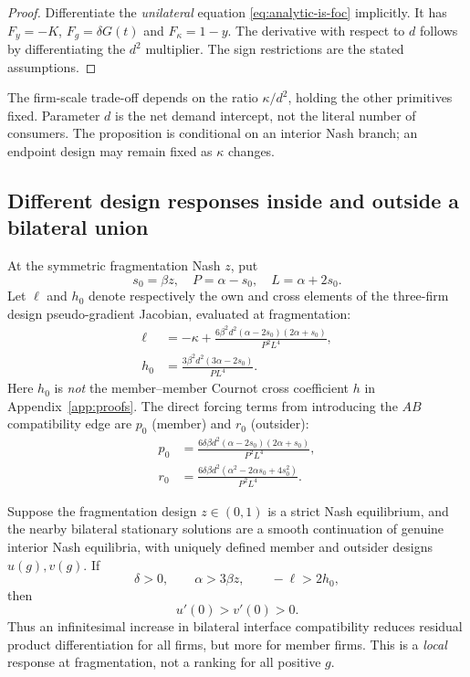 \begin{proof}
Differentiate the \emph{unilateral} equation
\eqref{eq:analytic-is-foc} implicitly.
It has $F_y=-K$, $F_g=\delta G(t)$ and
$F_\kappa=1-y$.
The derivative with respect to $d$ follows
by differentiating the $d^2$ multiplier.
The sign restrictions are the stated assumptions.
\end{proof}

The firm-scale trade-off depends on the ratio $\kappa/d^2$,
holding the other primitives fixed. Parameter $d$ is the
net demand intercept, not the literal number of consumers.
The proposition is conditional on an interior Nash branch;
an endpoint design may remain fixed as $\kappa$ changes.

\subsection{Different design responses inside and outside a bilateral union}

At the symmetric fragmentation Nash $z$, put
\[
 s_0=\beta z,\quad P=\alpha-s_0,\quad L=\alpha+2s_0.
\]
Let $\ell$ and $h_0$ denote respectively the own and
cross elements of the three-firm design pseudo-gradient
Jacobian, evaluated at fragmentation:
\begin{equation}\label{eq:analytic-lh}
\begin{split}
\ell&=-\kappa+
\frac{6\beta^2d^2(\alpha-2s_0)(2\alpha+s_0)}
 {P^2L^4},\\
h_0&=\frac{3\beta^2d^2(3\alpha-2s_0)}{PL^4}.
\end{split}
\end{equation}
Here $h_0$ is \emph{not} the member--member Cournot
cross coefficient $h$ in Appendix~\ref{app:proofs}.
The direct forcing terms from introducing the $AB$
compatibility edge are $p_0$ (member) and $r_0$ (outsider):
\begin{equation}\label{eq:analytic-pr}
\begin{split}
p_0&=\frac{6\delta\beta d^2(\alpha-2s_0)(2\alpha+s_0)}
 {P^2L^4},\\
r_0&=\frac{6\delta\beta d^2(\alpha^2-2\alpha s_0+4s_0^2)}
 {P^2L^4}.
\end{split}
\end{equation}

\begin{proposition}
\label{prop:analytic-B}
Suppose the fragmentation design $z\in(0,1)$ is a strict
Nash equilibrium, and the nearby bilateral stationary
solutions are a smooth continuation of genuine interior
Nash equilibria, with uniquely defined member and
outsider designs $u(g),v(g)$. If
\begin{equation}\label{eq:analytic-B-conditions}
 \delta>0,\qquad \alpha>3\beta z,\qquad -\ell>2h_0,
\end{equation}
then
\[
 \boxed{u'(0)>v'(0)>0.}
\]
Thus an infinitesimal increase in bilateral interface
compatibility reduces residual product differentiation
for all firms, but more for member firms.
This is a \emph{local} response at fragmentation,
not a ranking for all positive $g$.
\end{proposition}

